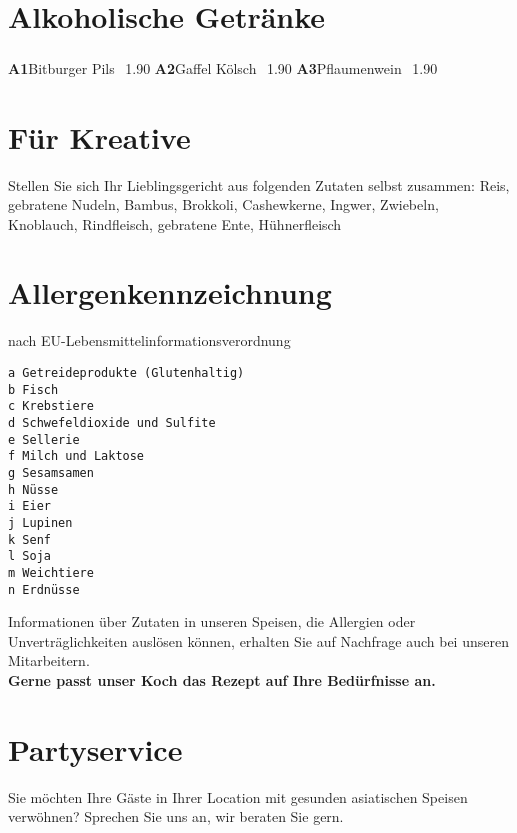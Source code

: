 \documentclass[a4paper,10pt,notumble]{leaflet}
\newcommand{\meal}[4]{\textbf{#1}\hspace{3mm}#2 \textsuperscript{#3}\hfill\SI{#4}{\EUR}\newline}
\begin{document}
\section*{Alkoholische Getränke}
\meal{A1}{Bitburger Pils}{~}{1.90}
\meal{A2}{Gaffel Kölsch}{~}{1.90}
\meal{A3}{Pflaumenwein}{~}{1.90}

\section*{Für Kreative}
Stellen Sie sich Ihr Lieblingsgericht aus folgenden Zutaten selbst zusammen:
Reis, gebratene Nudeln, Bambus, Brokkoli, Cashewkerne, Ingwer, Zwiebeln, Knoblauch,
Rindfleisch, gebratene Ente, Hühnerfleisch


\newpage
\section*{Allergenkennzeichnung}
nach EU-Lebensmittelinformationsverordnung
\begin{verbatim}
a Getreideprodukte (Glutenhaltig) 
b Fisch
c Krebstiere
d Schwefeldioxide und Sulfite 
e Sellerie
f Milch und Laktose
g Sesamsamen
h Nüsse
i Eier
j Lupinen
k Senf
l Soja
m Weichtiere
n Erdnüsse
\end{verbatim}

Informationen über Zutaten in unseren Speisen, die Allergien
oder Unverträglichkeiten auslösen können, erhalten Sie auf Nachfrage
auch bei unseren Mitarbeitern.\\ 
\textbf{Gerne passt unser Koch das Rezept auf Ihre Bedürfnisse an.}

\section*{Partyservice}
Sie möchten Ihre Gäste in Ihrer Location mit gesunden asiatischen Speisen verwöhnen? Sprechen Sie uns an, wir beraten Sie gern.
\end{document}
